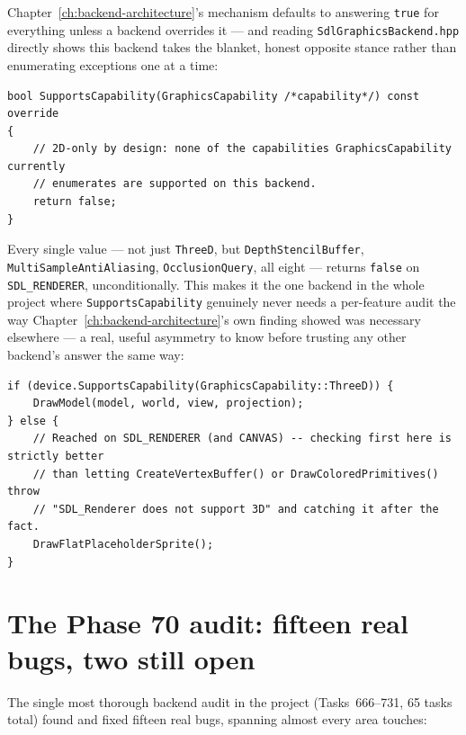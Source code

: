Chapter~\ref{ch:backend-architecture}'s  mechanism defaults to
answering \texttt{true} for everything unless a backend overrides it --- and reading
\texttt{SdlGraphicsBackend.hpp} directly shows this backend takes the blanket, honest opposite
stance rather than enumerating exceptions one at a time:

\begin{lstlisting}
bool SupportsCapability(GraphicsCapability /*capability*/) const override
{
    // 2D-only by design: none of the capabilities GraphicsCapability currently
    // enumerates are supported on this backend.
    return false;
}
\end{lstlisting}

Every single  value --- not just \texttt{ThreeD}, but
\texttt{DepthStencilBuffer}, \texttt{Multi\allowbreak{}Sample\allowbreak{}AntiAliasing},
\texttt{OcclusionQuery}, all
eight --- returns \texttt{false} on \texttt{SDL\_RENDERER}, unconditionally. This makes it the
one backend in the whole project where \texttt{SupportsCapability} genuinely never needs a
per-feature audit the way Chapter~\ref{ch:backend-architecture}'s own
 finding showed was necessary elsewhere --- a real, useful
asymmetry to know before trusting any other backend's answer the same way:

\begin{lstlisting}
if (device.SupportsCapability(GraphicsCapability::ThreeD)) {
    DrawModel(model, world, view, projection);
} else {
    // Reached on SDL_RENDERER (and CANVAS) -- checking first here is strictly better
    // than letting CreateVertexBuffer() or DrawColoredPrimitives() throw
    // "SDL_Renderer does not support 3D" and catching it after the fact.
    DrawFlatPlaceholderSprite();
}
\end{lstlisting}

\section{The Phase 70 audit: fifteen real bugs, two still open}
\label{sec:phase70-audit-bugs}

The single most thorough backend audit in the project (Tasks~666--731, 65 tasks total)
found and fixed fifteen real bugs, spanning almost every area 
touches:

